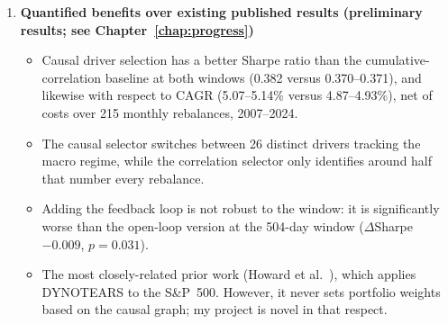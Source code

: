 \documentclass[12pt, a4paper]{report}
\begin{document}
\begin{enumerate}
\begin{enumerate}[label=\textbf{A\arabic*}]
        \item I construct portfolios with Causal-HSP, working inside the sensitivity space.
              Each asset's sensitivities to the selected drivers form a Euclidean embedding, so the
              distance matrix is symmetric by construction. Causal information then drives the
              clustering directly, with no symmetrisation of the causal graph, and the allocation
              step is left unchanged from the original HSP.

        \item I extend HSP with a closed feedback loop, which standard HSP lacks. Out-of-sample performance is attributed back to the drivers that shaped the portfolio
              and updates a utility score, which feeds into the next period's selection. I then evaluate whether this feedback improves robustness,
              using a backtest at two window durations.
    \end{enumerate}

    \item \textbf{Quantified benefits over existing published results (preliminary results; see Chapter~\ref{chap:progress})}
    \begin{itemize}
      \item Causal driver selection has a better Sharpe ratio than the cumulative-correlation baseline at
            both windows (0.382 versus 0.370--0.371), and likewise with respect to CAGR (5.07--5.14\% versus
            4.87--4.93\%), net of costs over 215 monthly rebalances, 2007--2024.
            
      \item The causal selector switches between 26 distinct drivers tracking the macro regime, while
            the correlation selector only identifies around half that number every rebalance.
            
      \item Adding the feedback loop is not robust to the window: it is significantly
            worse than the open-loop version at the 504-day window ($\Delta$Sharpe $-0.009$, $p=0.031$).
            
      \item The most closely-related prior work (Howard et al.\ \cite{howard2025causal}), which applies
            DYNOTEARS to the S\&P~500. However, it never sets portfolio weights based on the causal graph; my project is novel in that respect.
            
    \end{itemize}
\end{enumerate}
\end{document}
